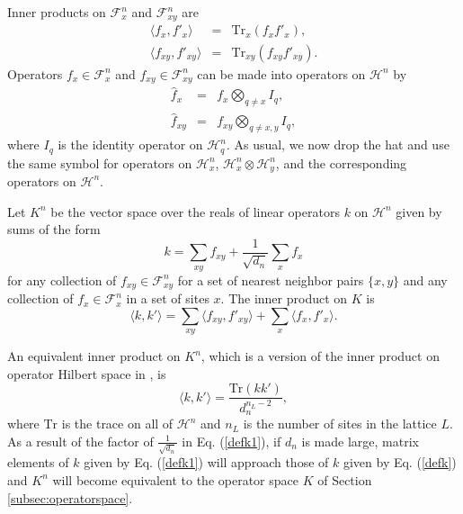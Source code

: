 \documentclass[12pt,amsmath,amssymb,onecolumn]{revtex4-2}
\begin{document}
Inner products on $\mathcal{F}^n_x$ and $\mathcal{F}^n_{xy}$ are
\begin{subequations}
\begin{eqnarray}
  \label{ffprime1}
   \langle  f_x, f'_x \rangle  &=& \mathrm{Tr}_x( f_x f'_x), \\
  \label{ffprime2}
   \langle  f_{xy}, f'_{xy} \rangle  &=& \mathrm{Tr}_{xy}( f_{xy} f'_{xy}).
\end{eqnarray}
\end{subequations}
Operators $f_x \in \mathcal{F}^n_x$ and $f_{xy} \in \mathcal{F}^n_{xy}$ can be made into
operators on $\mathcal{H}^n$ by
\begin{subequations}
\begin{eqnarray}
\label{defhf1}
\hat{ f}_x &=&  f_x \bigotimes_{q \ne x} I_q, \\
\label{defhf2}
\hat{ f}_{xy} &=&  f_{xy} \bigotimes_{q \ne x,y} I_q, 
\end{eqnarray}
\end{subequations}
where $I_q$ is the identity operator on $\mathcal{H}^n_q$.
As usual, we now drop the hat and use the same symbol for operators  
on $\mathcal{H}^n_x$,
$\mathcal{H}^n_x \otimes \mathcal{H}^n_y$,
and the corresponding operators on $\mathcal{H}^n$.

Let $K^n$ be the vector space over the
reals of linear operators $k$ on $\mathcal{H}^n$ given by sums of the form
\begin{equation}
\label{defk1}
k = \sum_{x y} f_{x y} + \frac{1}{\sqrt{d_n}} \sum_x f_x
\end{equation}
for any collection of 
$f_{x y} \in \mathcal{F}^n_{x y}$ for a set of nearest neighbor pairs $\{x, y\}$
and any collection of $f_x \in \mathcal{F}^n_x$ in a set of sites $x$.
The inner product on $K$ is
\begin{equation}
\label{defkkprime1}
 \langle  k, k' \rangle   =  \sum_{xy}  \langle  f_{xy}, f'_{xy} \rangle  + \sum_x  \langle  f_x, f'_x \rangle .
\end{equation}

An equivalent inner product on $K^n$, which is a version of the
inner product on operator Hilbert space in \cite{Nielsen}, is 
\begin{equation}
  \label{defggprime}
   \langle  k, k' \rangle  = \frac{ \mathrm{Tr}( k k')}{ d_n^{n_L - 2}},
\end{equation}
where $\mathrm{Tr}$ is the trace on all of $\mathcal{H}^n$ and $n_L$
is the number of sites in the lattice $L$.
As a result of the factor of $\frac{1}{\sqrt{d_n}}$ in Eq. (\ref{defk1}),
if $d_n$ is made large, matrix elements of $k$ given by
Eq. (\ref{defk1}) will approach those of $k$ given
by Eq. (\ref{defk}) and  $K^n$ will become equivalent to
the operator space $K$ of Section \ref{subsec:operatorspace}.
\end{document}
